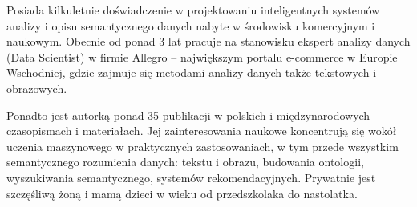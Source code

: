 \documentclass[\main/boa.tex]{subfiles}
\begin{document}
Posiada kilkuletnie doświadczenie w projektowaniu inteligentnych systemów analizy i opisu semantycznego danych nabyte w środowisku komercyjnym i naukowym. Obecnie od ponad 3 lat pracuje na stanowisku ekspert analizy danych (Data Scientist) w firmie Allegro – największym portalu e-commerce w Europie Wschodniej, gdzie zajmuje się metodami analizy danych także tekstowych i obrazowych.

Ponadto jest autorką ponad 35 publikacji w polskich i międzynarodowych czasopismach i materiałach. Jej zainteresowania naukowe koncentrują się wokół uczenia maszynowego w praktycznych zastosowaniach, w tym przede wszystkim semantycznego rozumienia danych: tekstu i obrazu, budowania ontologii, wyszukiwania semantycznego, systemów rekomendacyjnych. Prywatnie jest szczęśliwą żoną i mamą dzieci w wieku od przedszkolaka do nastolatka.
\end{document}
